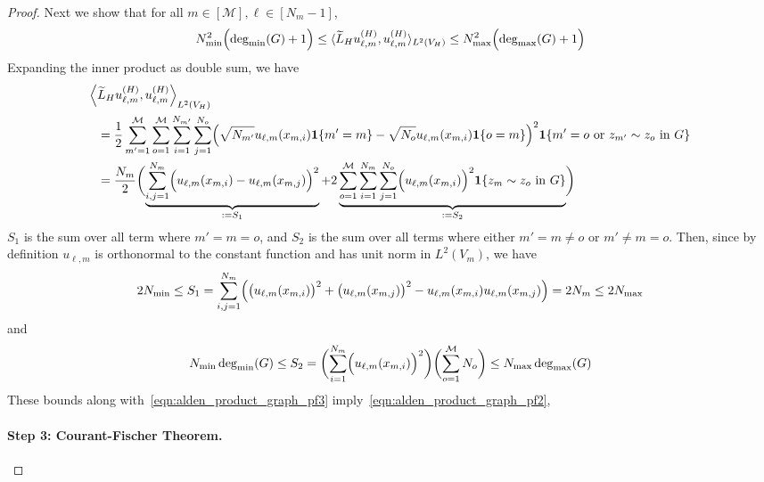 \documentclass{article}
\newcommand{\1}{\mathbf{1}}
\newcommand{\dotp}[2]{\langle #1, #2 \rangle}
\newcommand{\wt}[1]{\widetilde{#1}}
\newcommand{\mc}[1]{\mathcal{#1}}
\theoremstyle{alden}
\theoremstyle{aldenthm}
\theoremstyle{definition}
\theoremstyle{remark}
\begin{document}
\begin{proof}
Next we show that for all $m \in [\mc{M}], \ell \in [N_m - 1]$,
\begin{equation}
\label{eqn:alden_product_graph_pf2}
N_{\min}^2\Bigl(\deg_{\min}(G) + 1\Bigr) \leq \dotp{\wt{L}_H u_{\ell,m}^{(H)}}{u_{\ell,m}^{(H)}}_{L^2(V_H)} \leq N_{\max}^2 \Bigl(\deg_{\max}(G) + 1\Bigr) 
\end{equation}
Expanding the inner product as double sum, we have
\begin{align}
\Bigl \langle & \wt{L}_H u_{\ell,m}^{(H)}, u_{\ell,m}^{(H)} \Bigr \rangle_{L^2(V_H)} \\
& = \frac{1}{2} \sum_{m' = 1}^{\mc{M}} \sum_{o = 1}^{\mc{M}} \sum_{i = 1}^{N_{m'}} \sum_{j = 1}^{N_o} \Bigl( \sqrt{N_{m'}} u_{\ell,m}(x_{m,i}) \1\{m' = m\} - \sqrt{N_o} u_{\ell,m}(x_{m,i}) \1\{o = m\}\Bigr)^2 \1\{m' = o~\textrm{or}~z_{m'} \sim z_o~\textrm{in $G$}\} \nonumber \\
& =  \frac{N_m}{2}\biggl(\underbrace{\sum_{i,j = 1}^{N_m} \Bigl( u_{\ell,m}(x_{m,i}) -  u_{\ell,m}(x_{m,j})\Bigr)^2}_{:=S_1} + 2 \underbrace{\sum_{o = 1}^{\mc{M}} \sum_{i = 1}^{N_{m}} \sum_{j = 1}^{N_o}  \Bigl( u_{\ell,m}(x_{m,i})\Bigr)^2 \1\{z_m \sim z_o~\textrm{in $G$}\}}_{:=S_2} \biggr) \label{eqn:alden_product_graph_pf3}
\end{align}
$S_1$ is the sum over all term where $m' = m = o$, and $S_2$ is the sum over all terms where either $m' = m \neq o$ or $m' \neq m = o$. Then, since by definition $u_{\ell,m}$ is orthonormal to the constant function and has unit norm in $L^2(V_m)$, we have
\begin{equation*}
2N_{\min} \leq S_1 = \sum_{i,j = 1}^{N_m} \Bigl( \bigl(u_{\ell,m}(x_{m,i})\bigr)^2 + \bigl(u_{\ell,m}(x_{m,j})\bigr)^2 - u_{\ell,m}(x_{m,i}) u_{\ell,m}(x_{m,j})\Bigr) = 2N_m \leq 2N_{\max}
\end{equation*}
and
\begin{equation*}
N_{\min} \deg_{\min}(G) \leq S_2 = \biggl(\sum_{i = 1}^{N_{m}} \Bigl(u_{\ell,m}(x_{m,i})\Bigr)^2 \biggr) \biggl(\sum_{o = 1}^{\mc{M}} N_o\biggr) \leq N_{\max} \deg_{\max}(G)
\end{equation*}
These bounds along with~\eqref{eqn:alden_product_graph_pf3} imply~\eqref{eqn:alden_product_graph_pf2},

\paragraph{Step 3: Courant-Fischer Theorem.}


\end{proof}
\end{document}

